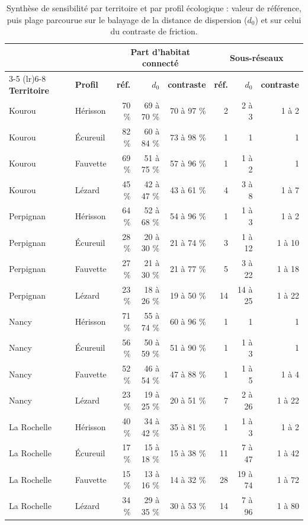 \documentclass[a4paper,12pt]{report}
\renewcommand{\arraystretch}{1.2}
\begin{document}
\begin{table}[H]
\centering
\footnotesize
\setlength{\tabcolsep}{4pt}
\renewcommand{\arraystretch}{1.05}
\caption{Synthèse de sensibilité par territoire et par profil écologique : valeur de référence, puis plage parcourue sur le balayage de la distance de dispersion ($d_0$) et sur celui du contraste de friction.}
\begin{tabular}{@{}llrrrrrr@{}}
\toprule
 & & \multicolumn{3}{c}{\textbf{Part d'habitat connecté}} & \multicolumn{3}{c}{\textbf{Sous-réseaux}} \\
\cmidrule(lr){3-5} \cmidrule(lr){6-8}
\textbf{Territoire} & \textbf{Profil} & \textbf{réf.} & \textbf{$d_0$} & \textbf{contraste} & \textbf{réf.} & \textbf{$d_0$} & \textbf{contraste} \\
\midrule
Kourou & Hérisson & 70 \% & 69 à 70 \% & 70 à 97 \% & 2 & 2 à 3 & 1 à 2 \\
Kourou & Écureuil & 82 \% & 60 à 84 \% & 73 à 98 \% & 1 & 1 & 1 \\
Kourou & Fauvette & 69 \% & 51 à 75 \% & 57 à 96 \% & 1 & 1 à 2 & 1 \\
Kourou & Lézard & 45 \% & 42 à 47 \% & 43 à 61 \% & 4 & 3 à 8 & 1 à 7 \\
Perpignan & Hérisson & 64 \% & 52 à 68 \% & 54 à 96 \% & 1 & 1 à 3 & 1 à 2 \\
Perpignan & Écureuil & 28 \% & 20 à 30 \% & 21 à 74 \% & 3 & 1 à 12 & 1 à 10 \\
Perpignan & Fauvette & 27 \% & 21 à 30 \% & 21 à 77 \% & 5 & 3 à 22 & 1 à 18 \\
Perpignan & Lézard & 23 \% & 18 à 26 \% & 19 à 50 \% & 14 & 14 à 25 & 1 à 22 \\
Nancy & Hérisson & 71 \% & 55 à 74 \% & 60 à 96 \% & 1 & 1 & 1 \\
Nancy & Écureuil & 56 \% & 50 à 59 \% & 51 à 90 \% & 1 & 1 à 3 & 1 \\
Nancy & Fauvette & 52 \% & 46 à 54 \% & 47 à 88 \% & 1 & 1 à 5 & 1 à 4 \\
Nancy & Lézard & 23 \% & 19 à 25 \% & 20 à 51 \% & 7 & 2 à 26 & 1 à 22 \\
La Rochelle & Hérisson & 40 \% & 34 à 42 \% & 35 à 81 \% & 1 & 1 à 3 & 1 à 2 \\
La Rochelle & Écureuil & 17 \% & 15 à 18 \% & 15 à 38 \% & 11 & 7 à 47 & 1 à 42 \\
La Rochelle & Fauvette & 15 \% & 13 à 16 \% & 14 à 32 \% & 28 & 19 à 74 & 1 à 72 \\
La Rochelle & Lézard & 34 \% & 29 à 35 \% & 30 à 53 \% & 14 & 7 à 96 & 1 à 80 \\

\end{tabular}
\end{table}
\end{document}
